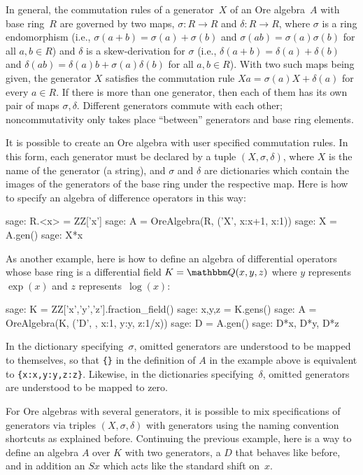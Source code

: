 \documentclass{amsart}
\let\set\mathbbm
\begin{document}
In general, the commutation rules of a generator~$X$ of an Ore algebra~$A$ with
base ring~$R$ are governed by two maps, $\sigma\colon R\to R$ and $\delta\colon R\to R$,
where $\sigma$ is a ring endomorphism (i.e., $\sigma(a+b)=\sigma(a)+\sigma(b)$ and
$\sigma(ab)=\sigma(a)\sigma(b)$ for all $a,b\in R$) and $\delta$ is a skew-derivation
for $\sigma$ (i.e., $\delta(a+b)=\delta(a)+\delta(b)$ and $\delta(ab)=\delta(a)b
+\sigma(a)\delta(b)$ for all $a,b\in R$). With two such maps being given, the
generator $X$ satisfies the commutation rule $Xa=\sigma(a)X+\delta(a)$ for every
$a\in R$. If there is more than one generator, then each of them has its own pair
of maps $\sigma,\delta$. Different generators commute with each other; 
noncommutativity only takes place ``between'' generators and base ring elements. 

It is possible to create an Ore algebra with user specified commutation rules.
In this form, each generator must be declared by a tuple $(X,\sigma,\delta)$, 
where $X$ is the name of the generator (a string), and $\sigma$ and $\delta$
are dictionaries which contain the images of the generators of the base
ring under the respective map. Here is how to specify an algebra of difference
operators in this way:

\begin{sageexample}
  sage: R.<x> = ZZ['x']
  sage: A = OreAlgebra(R, ('X', {x:x+1}, {x:1}))
  sage: X = A.gen()
  sage: X*x
\end{sageexample}

As another example, here is how to define an algebra of differential operators 
whose base ring is a differential field $K=\set Q(x,y,z)$ where $y$ represents
$\exp(x)$ and $z$ represents~$\log(x)$:

\begin{sageexample}
  sage: K = ZZ['x','y','z'].fraction_field()
  sage: x,y,z = K.gens()
  sage: A = OreAlgebra(K, ('D', {}, {x:1, y:y, z:1/x}))
  sage: D = A.gen()
  sage: D*x, D*y, D*z
\end{sageexample}

In the dictionary specifying~$\sigma$, omitted generators are understood to be
mapped to themselves, so that \verb|{}| in the definition of $A$ in the example
above is equivalent to \verb|{x:x,y:y,z:z}|.  Likewise, in the dictionaries
specifying~$\delta$, omitted generators are understood to be mapped to zero.

For Ore algebras with several generators, it is possible to mix specifications
of generators via triples $(X,\sigma,\delta)$ with generators using the naming
convention shortcuts as explained before. Continuing the previous example,
here is a way to define an algebra $A$ over $K$ with two generators, a $D$ 
that behaves like before, and in addition an $Sx$ which acts like the standard
shift on~$x$.
\end{document}
